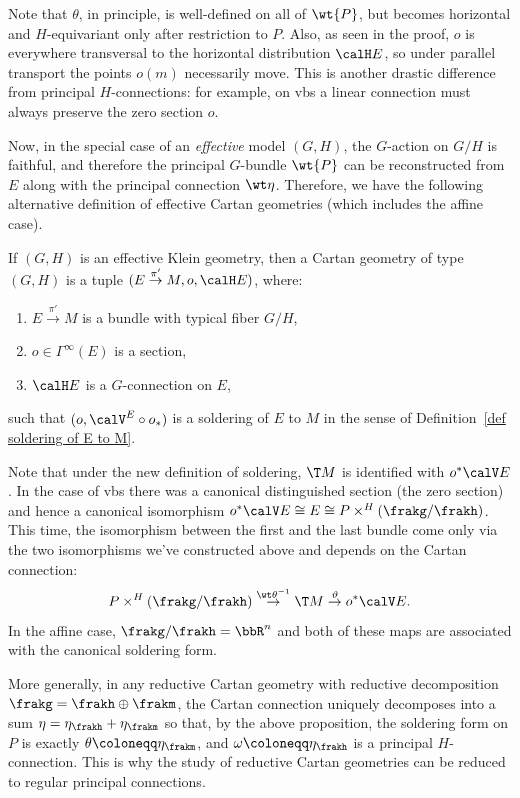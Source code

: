 Note that $\theta$, in principle, is well-defined on all of $\wt{P}$, but becomes horizontal and $H$-equivariant only after restriction to $P$. Also, as seen in the proof, $o$ is everywhere transversal to the horizontal distribution $\calH E$, so under parallel transport the points $o(m)$ necessarily move. This is another drastic difference from principal $H$-connections: for example, on \glspl{vb} a linear connection must always preserve the zero section $o$.

Now, in the special case of an \emph{effective} model $(G,H)$, the $G$-action on $G\slash H$ is faithful, and therefore the principal $G$-bundle $\wt{P}$ can be reconstructed from $E$ along with the principal connection $\wt\eta$. Therefore, we have the following alternative definition of effective Cartan geometries (which includes the affine case).

\begin{defn}\label{def cartan geom iii}
    If $(G,H)$ is an effective Klein geometry, then a Cartan geometry of type $(G,H)$ is a tuple $(E\overset{\pi'}{\to}M,o,\calH E)$, where: 
    \begin{enumerate}
        \item $E\overset{\pi'}{\to}M$ is a bundle with typical fiber $G\slash H$, 
        \item $o\in\Gamma^\infty(E)$ is a section,
        \item $\calH E$ is a $G$-connection on $E$,
    \end{enumerate}
    such that $(o,\calV^E\circ o_\ast)$ is a soldering of $E$ to $M$ in the sense of Definition~\ref{def soldering of E to M}.
\end{defn}


\begin{rem}
    Note that under the new definition of soldering, $\T M$ is identified with $o^\ast \calV E$. In the case of \glspl{vb} there was a canonical distinguished section (the zero section) and hence a canonical isomorphism $o^\ast\calV E\cong E\cong P\times^H (\frakg\slash\frakh)$. This time, the isomorphism between the first and the last bundle come only via the two isomorphisms we've constructed above and depends on the Cartan connection:
    \[P\times^H(\frakg\slash\frakh)\overset{{\wt\theta}^{-1}}{\to}\T M\overset{\vartheta}{\to}o^\ast\calV E.\]
    In the affine case, $\frakg\slash\frakh=\bbR^n$ and both of these maps are associated with the canonical soldering form. 
    
    More generally, in any reductive Cartan geometry with reductive decomposition $\frakg=\frakh\oplus\frakm$, the Cartan connection uniquely decomposes into a sum $\eta=\eta_\frakh+\eta_\frakm$ so that, by the above proposition, the soldering form on $P$ is exactly $\theta\coloneqq \eta_\frakm$, and $\omega\coloneqq \eta_\frakh$ is a principal $H$-connection. This is why the study of reductive Cartan geometries can be reduced to regular principal connections.
\end{rem}

